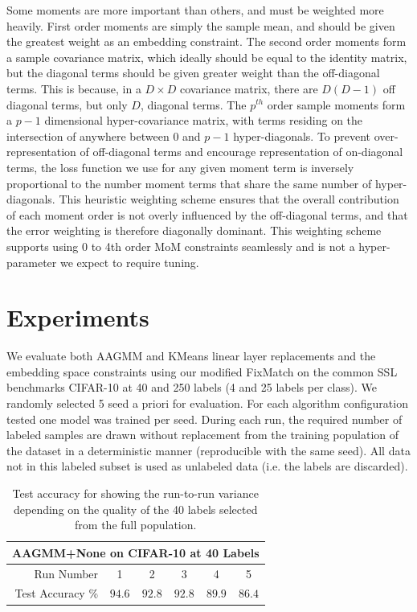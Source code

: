 \documentclass[10pt,twocolumn,letterpaper]{article}
\begin{document}
Some moments are more important than others, and must be weighted more heavily.  
First order moments are simply the sample mean, and should be given the greatest weight as an embedding constraint.  
The second order moments form a sample covariance matrix, which ideally should be equal to the identity matrix, but the diagonal terms should be given greater weight than the off-diagonal terms.  
This is because, in a $D \times D$ covariance matrix, there are $D(D-1)$ off diagonal terms, but only $D$, diagonal terms.  
The $p^{th}$ order sample moments form a $p-1$ dimensional hyper-covariance matrix, with terms residing on the intersection of anywhere between $0$ and $p-1$ hyper-diagonals.  
To prevent over-representation of off-diagonal terms and encourage representation of on-diagonal terms, the loss function we use for any given moment term is inversely proportional to the number moment terms that share the same number of hyper-diagonals.  
This heuristic weighting scheme ensures that the overall contribution of each moment order is not overly influenced by the off-diagonal terms, and that the error weighting is therefore diagonally dominant.
This weighting scheme supports using 0 to 4th order MoM constraints seamlessly and is not a hyper-parameter we expect to require tuning.

\section{Experiments}



We evaluate both AAGMM and KMeans linear layer replacements and the embedding space constraints using our modified FixMatch\cite{sohn2020fixmatch} on the common SSL benchmarks CIFAR-10 \cite{cifar10} at 40 and 250 labels (4 and 25 labels per class). 
We randomly selected 5 seed a priori for evaluation.
For each algorithm configuration tested one model was trained per seed.
During each run, the required number of labeled samples are drawn without replacement from the training population of the dataset in a deterministic manner (reproducible with the same seed).
All data not in this labeled subset is used as unlabeled data (i.e. the labels are discarded).



\begin{table}[h!]
	\begin{tabular}{r|c|c|c|c|c}
		\multicolumn{6}{c}{AAGMM+None on CIFAR-10 at 40 Labels}\\
		\hline
		Run Number & 1 & 2 & 3 & 4 & 5 \\
		\hline
		Test Accuracy \% & $94.6$ & $92.8$ & $92.8$ & $89.9$ & $86.4$ \\
	\end{tabular}
	\caption{Test accuracy for showing the run-to-run variance depending on the quality of the 40 labels selected from the full population.}
	\label{tab:runvariability}
\end{table}
\end{document}
